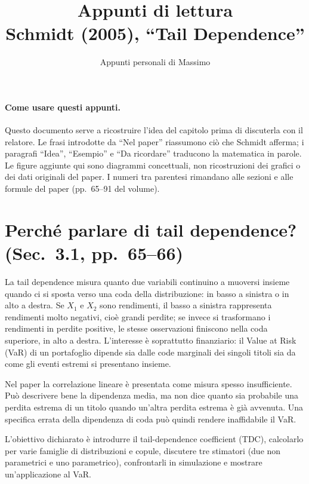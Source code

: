 \documentclass[11pt,a4paper]{article}
\title{Appunti di lettura\\\large Schmidt (2005), ``Tail Dependence''}
\author{Appunti personali di Massimo}
\date{}
\begin{document}
\maketitle

\paragraph{Come usare questi appunti.}
Questo documento serve a ricostruire l'idea del capitolo prima di discuterla
con il relatore. Le frasi introdotte da ``Nel paper'' riassumono ciò che
Schmidt afferma; i paragrafi ``Idea'', ``Esempio'' e ``Da ricordare'' traducono
la matematica in parole. Le figure aggiunte qui sono diagrammi concettuali,
non ricostruzioni dei grafici o dei dati originali del paper. I numeri tra
parentesi rimandano alle sezioni e alle formule del paper (pp.~65--91 del
volume).

\section{Perché parlare di tail dependence? (Sec.~3.1, pp.~65--66)}

La tail dependence misura quanto due variabili continuino a muoversi insieme
quando ci si sposta verso una coda della distribuzione: in basso a sinistra o
in alto a destra. Se $X_1$ e $X_2$ sono rendimenti, il basso a sinistra
rappresenta rendimenti molto negativi, cioè grandi perdite; se invece si
trasformano i rendimenti in perdite positive, le stesse osservazioni finiscono
nella coda superiore, in alto a destra. L'interesse è soprattutto finanziario:
il Value at Risk (VaR)
di un portafoglio dipende sia dalle code marginali dei singoli titoli sia da
come gli eventi estremi si presentano insieme.

Nel paper la correlazione lineare è presentata come misura spesso
insufficiente. Può descrivere bene la dipendenza media, ma non dice quanto sia
probabile una perdita estrema di un titolo quando un'altra perdita estrema è
già avvenuta. Una specifica errata della dipendenza di coda può quindi rendere
inaffidabile il VaR.

L'obiettivo dichiarato è introdurre il tail-dependence coefficient (TDC),
calcolarlo per varie famiglie di distribuzioni e copule, discutere tre
stimatori (due non parametrici e uno parametrico), confrontarli in simulazione
e mostrare un'applicazione al VaR.
\end{document}

